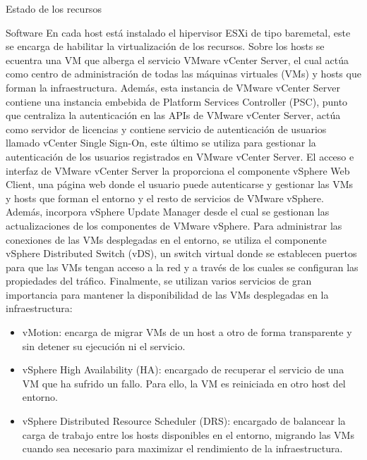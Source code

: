 \begin{chapter}{Estado de los recursos}
\begin{section}{Software}
    En cada host está instalado el hipervisor ESXi de tipo baremetal, este se encarga de habilitar la virtualización de los recursos. Sobre los hosts se ecuentra una VM que alberga el servicio VMware vCenter Server, el cual actúa como centro de administración de todas las máquinas virtuales (VMs) y hosts que forman la infraestructura. Además, esta instancia de VMware vCenter Server contiene una instancia embebida de Platform Services Controller (PSC), punto que centraliza la autenticación en las APIs de VMware vCenter Server, actúa como servidor de licencias y contiene servicio de autenticación de usuarios llamado vCenter Single Sign-On, este último se utiliza para gestionar la autenticación de los usuarios registrados en VMware vCenter Server. El acceso e interfaz de VMware vCenter Server la proporciona el componente vSphere Web Client, una página web donde el usuario puede autenticarse y gestionar las VMs y hosts que forman el entorno y el resto de servicios de VMware vSphere. Además, incorpora vSphere Update Manager desde el cual se gestionan las actualizaciones de los componentes de VMware vSphere. Para administrar las conexiones de las VMs desplegadas en el entorno, se utiliza el componente vSphere Distributed Switch (vDS), un switch virtual donde se establecen puertos para que las VMs tengan acceso a la red y a través de los cuales se configuran las propiedades del tráfico. Finalmente, se utilizan varios servicios de gran importancia para mantener la disponibilidad de las VMs desplegadas en la infraestructura:
    
    \begin{itemize}
        \item vMotion: encarga de migrar VMs de un host a otro de forma transparente y sin detener su ejecución ni el servicio.
        
        \item vSphere High Availability (HA): encargado de recuperar el servicio de una VM que ha sufrido un fallo. Para ello, la VM es reiniciada en otro host del entorno.
        
        \item vSphere Distributed Resource Scheduler (DRS): encargado de balancear la carga de trabajo entre los hosts disponibles en el entorno, migrando las VMs cuando sea necesario para maximizar el rendimiento de la infraestructura. 
        

\end{itemize}
\end{section}
\end{chapter}
